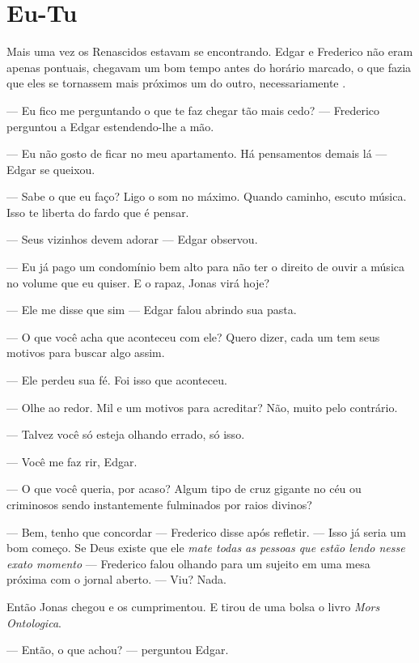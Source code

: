 \chapter{Eu-Tu}

Mais uma vez os Renascidos estavam se encontrando. Edgar e Frederico não eram apenas pontuais,  chegavam um bom tempo antes do horário marcado, o que fazia que eles se tornassem mais próximos um do outro,  necessariamente .

--- Eu fico me perguntando\mudanca{,} o que te faz chegar tão mais cedo? --- Frederico perguntou a Edgar\mudanca{,} estendendo-lhe a mão.

--- Eu não gosto de ficar no meu apartamento. Há pensamentos demais lá --- Edgar se queixou.

--- Sabe o que eu faço? Ligo o som no máximo. Quando caminho, escuto música. Isso te liberta do fardo que é pensar.

--- Seus vizinhos devem adorar --- Edgar observou.

--- Eu já pago um condomínio bem alto para não ter o direito de ouvir a música no volume que eu quiser. E o rapaz, Jonas\mudanca{,} virá hoje?

--- Ele me disse que sim --- Edgar falou\mudanca{,} abrindo sua pasta.

--- O que você acha que aconteceu com ele? Quero dizer, cada um tem seus motivos para buscar algo assim.

--- Ele perdeu sua fé. Foi isso que aconteceu.

--- Olhe ao redor. Mil e um motivos para acreditar? Não, muito pelo contrário.

--- Talvez você só esteja olhando errado, só isso.

--- Você me faz rir, Edgar.

--- O que você queria, por acaso? Algum tipo de cruz gigante no céu ou criminosos sendo instantemente fulminados por raios divinos?

--- Bem, tenho que concordar --- Frederico disse após refletir. --- Isso já seria um bom começo. Se Deus existe que ele \emph{mate todas as pessoas que estão lendo nesse exato momento} --- Frederico falou\mudanca{,} olhando para um sujeito em uma mesa próxima com o jornal aberto. --- Viu? Nada.

Então Jonas chegou e os cumprimentou. E tirou de uma bolsa o livro \emph{Mors Ontologica}.

--- Então, o que achou? --- perguntou Edgar.

